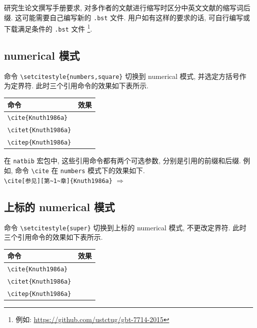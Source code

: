 研究生论文撰写手册要求, 对多作者的文献进行缩写时区分中英文文献的缩写词后缀. 这可能需要自己编写新的 \verb|.bst| 文件. 用户如有这样的要求的话, 可自行编写或下载满足条件的 \verb|.bst| 文件
\footnote{例如: \url{https://github.com/ustctug/gbt-7714-2015}}.

\subsection{numerical 模式}

命令 \verb|\setcitestyle{numbers,square}| 切换到 numerical 模式, 并选定方括号作为定界符.
此时三个引用命令的效果如下表所示.

\begin{center}
  \begin{tabular}{ll}
    \toprule
    命令                      & 效果\\
    \midrule
    \verb|\cite{Knuth1986a}|  & \cite{Knuth1986a}\\
    \verb|\citet{Knuth1986a}| & \citet{Knuth1986a}\\
    \verb|\citep{Knuth1986a}| & \citep{Knuth1986a}\\
    \bottomrule
  \end{tabular}
\end{center}

在 \verb|natbib| 宏包中, 这些引用命令都有两个可选参数, 分别是引用的前缀和后缀.
例如, 命令 \verb|\cite| 在 \verb|numbers| 模式下的效果如下.\\
\verb|\cite[参见][第~1~章]{Knuth1986a}|
$\Rightarrow$
\cite[参见][第~1~章]{Knuth1986a}

\subsection{上标的 numerical 模式}

命令 \verb|\setcitestyle{super}| 切换到上标的 numerical 模式, 不更改定界符.
此时三个引用命令的效果如下表所示.

\begin{center}
  \begin{tabular}{ll}
    \toprule
    命令                      & 效果\\
    \midrule
    \verb|\cite{Knuth1986a}|  & \cite{Knuth1986a}\\
    \verb|\citet{Knuth1986a}| & \citet{Knuth1986a}\\
    \verb|\citep{Knuth1986a}| & \citep{Knuth1986a}\\
    \bottomrule
  \end{tabular}
\end{center}


